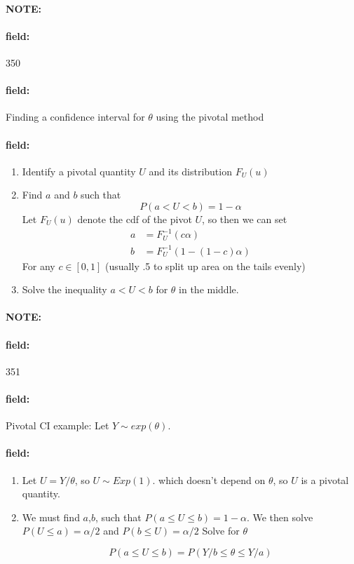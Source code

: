 \documentclass[12pt]{article}
\newenvironment{note}{\paragraph{NOTE:}}{}
\newenvironment{field}{\paragraph{field:}}{}
\begin{document}
\begin{note}
    \begin{field}
        \tiny 350
    \end{field}
    \begin{field}
        Finding a confidence interval for $\theta$ using the pivotal method
    \end{field}
    \begin{field}
        \begin{enumerate}
          \item Identify a pivotal quantity $U$ and its distribution $F_U(u)$
          \item Find $a$ and $b$ such that $$ P(a < U < b)= 1 - \alpha$$
          Let $F_U(u)$ denote the cdf of the pivot $U$, so then we can set \begin{align*}
            a &= F_U^{-1}(c \alpha)\\
            b &= F_U^{-1}(1 - (1 - c)\alpha)
        \end{align*}
        For any $c \in [0,1]$ (usually .5 to split up area on the tails evenly)
        \item Solve the inequality $a < U < b$ for $\theta$ in the middle.
        \end{enumerate}
    \end{field}
\end{note}

\begin{note}
    \begin{field}
        \tiny 351
    \end{field}
    \begin{field}
        Pivotal CI example: Let $Y \sim exp(\theta)$.
    \end{field}
    \begin{field}
        \begin{enumerate}
          \item Let $U = Y/\theta$, so $U \sim Exp(1)$. which doesn't depend on $\theta$, so $U$ is a pivotal quantity.
          \item We must find $a$,$b$, such that $P(a \leq U \leq b) = 1- \alpha$.
          We then solve $P(U \leq a) = \alpha/2$ and $P(b \leq U) = \alpha/2$
          Solve for $\theta$

          $$ P(a \leq U \leq b) = P(Y/b \leq \theta \leq Y/a) $$
        \end{enumerate}
    \end{field}
\end{note}
\end{document}
